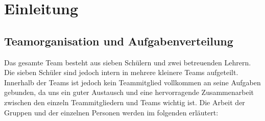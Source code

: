 \section{Einleitung}
\subsection{Teamorganisation und Aufgabenverteilung }

Das gesamte Team besteht aus sieben Schülern und zwei betreuenden Lehrern. Die sieben Schüler sind jedoch intern in mehrere kleinere Teams aufgeteilt. Innerhalb der Teams ist jedoch kein Teammitglied vollkommen an seine Aufgaben gebunden, da uns ein guter Austausch und eine hervorragende Zusammenarbeit zwischen den einzeln Teammitgliedern und Teams wichtig ist. Die Arbeit der Gruppen und der einzelnen Personen werden im folgenden erläutert:

